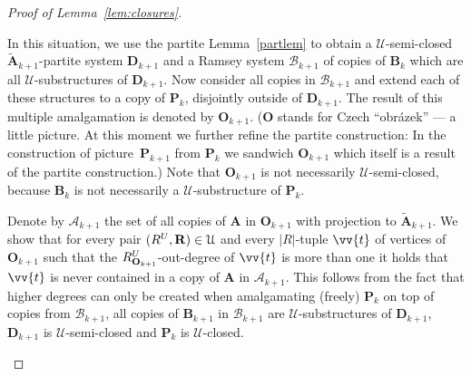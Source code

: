 \documentclass{elsarticle}
\def\str#1{\mathbf {#1}}
\def\nbrel#1#2{R\ifstrempty{#1}{}{_{#1}}\ifstrempty{#2}{}{^{#2}}}
\def\rel#1#2{\nbrel{\ifstrempty{#1}{}{\str{#1}}}{#2}}
\theoremstyle{plain}
\theoremstyle{definition}
\theoremstyle{remark}
\begin{document}
\begin{proof}[Proof of Lemma~\ref{lem:closures}]
\begin{enumerate}
In this situation, we use the partite Lemma~\ref{partlem} to obtain
a $\mathcal U$-semi-closed $\widetilde{\str{A}}_{k+1}$-partite system $\str{D}_{k+1}$ and a Ramsey system $\mathcal B_{k+1}$ of copies of $\str{B}_k$ which are all $\mathcal U$-substructures of $\str{D}_{k+1}$.
Now consider all copies in $\mathcal B_{k+1}$ and extend each of these structures to a copy of $\str{P}_k$, disjointly outside of $\str{D}_{k+1}$.
The result of this multiple amalgamation is denoted by $\str{O}_{k+1}$. ($\str{O}$ stands for Czech ``obr\'azek'' --- 
a little picture. At this moment  we further refine the partite construction: In the construction
of picture~$\str{P}_{k+1}$ from $\str{P}_k$ we sandwich $\str{O}_{k+1}$ which itself is a result of the partite construction.)
Note that $\str{O}_{k+1}$ is not necessarily $\mathcal{U}$-semi-closed, because $\str{B}_k$ is not necessarily a $\mathcal U$-substructure of $\str{P}_k$.

Denote by $\mathcal{A}_{k+1}$ the set of all copies of $\str{A}$ in $\str{O}_{k+1}$ with projection to $\widetilde{\str{A}}_{k+1}$. 
 We show that for every pair $(\rel{}{U} ,\str{R}) \in \mathcal U$ and every $\vert R\vert $-tuple $\vv{t}$ of vertices of $\str{O}_{k+1}$
such that the $\nbrel{\str{O}_{k+1}}{U}$-out-degree of $\vv{t}$ is more than one it holds that  $\vv{t}$ is never contained in a copy
of $\str{A}$ in $\mathcal A_{k+1}$. This follows from the fact that higher degrees can only be created when amalgamating (freely) $\str P_k$ on top of copies from $\mathcal B_{k+1}$, all copies of $\str{B}_{k+1}$ in $\mathcal B_{k+1}$ are $\mathcal U$-substructures of $\str{D}_{k+1}$,
$\str{D}_{k+1}$ is $\mathcal U$-semi-closed and $\str{P}_k$ is $\mathcal U$-closed.


\end{enumerate}
\end{proof}
\end{document}
